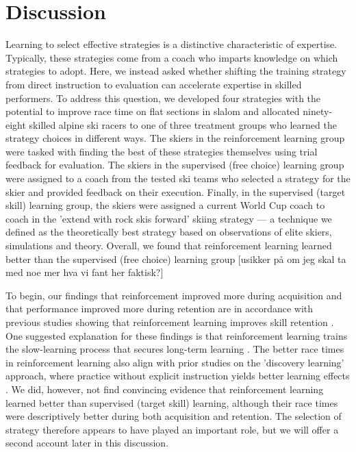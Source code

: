 \documentclass[pdflatex,sn-mathphys-num]{sn-jnl}%
\theoremstyle{thmstyleone}%
\theoremstyle{thmstyletwo}%
\theoremstyle{thmstylethree}%
\begin{document}
\section{Discussion}

Learning to select effective strategies is a distinctive characteristic of expertise. Typically, these strategies come from a coach who imparts knowledge on which strategies to adopt. Here, we instead asked whether shifting the training strategy from direct instruction to evaluation can accelerate expertise in skilled performers. To address this question, we developed four strategies with the potential to improve race time on flat sections in slalom and allocated ninety-eight skilled alpine ski racers to one of three treatment groups who learned the strategy choices in different ways. The skiers in the reinforcement learning group were tasked with finding the best of these strategies themselves using trial feedback for evaluation. The skiers in the supervised (free choice) learning group were assigned to a coach from the tested ski teams who selected a strategy for the skier and provided feedback on their execution. Finally, in the supervised (target skill) learning group, the skiers were assigned a current World Cup coach to coach in the 'extend with rock skis forward' skiing strategy — a technique we defined as the theoretically best strategy based on observations of elite skiers, simulations and theory. Overall, we found that reinforcement learning learned better than the supervised (free choice) learning group [usikker på om jeg skal ta med noe mer hva vi fant her faktisk?]

To begin, our findings that reinforcement improved more during acquisition and that performance improved more during retention are in accordance with previous studies showing that reinforcement learning improves skill retention \cite{therrien_effective_2016, truong_error-based_2023, hasson_reinforcement_2015}. One suggested explanation for these findings is that reinforcement learning trains the slow-learning process that secures long-term learning \cite{huang_rethinking_2011}. The better race times in reinforcement learning also align with prior studies on the 'discovery learning' approach, where practice without explicit instruction yields better learning effects \cite{wulf_instructions_1997, hodges_learning_2001, hodges_role_1999}. We did, however, not find convincing evidence that reinforcement learning learned better than supervised (target skill) learning, although their race times were descriptively better during both acquisition and retention. The selection of strategy therefore appears to have played an important role, but we will offer a second account later in this discussion.
\end{document}
